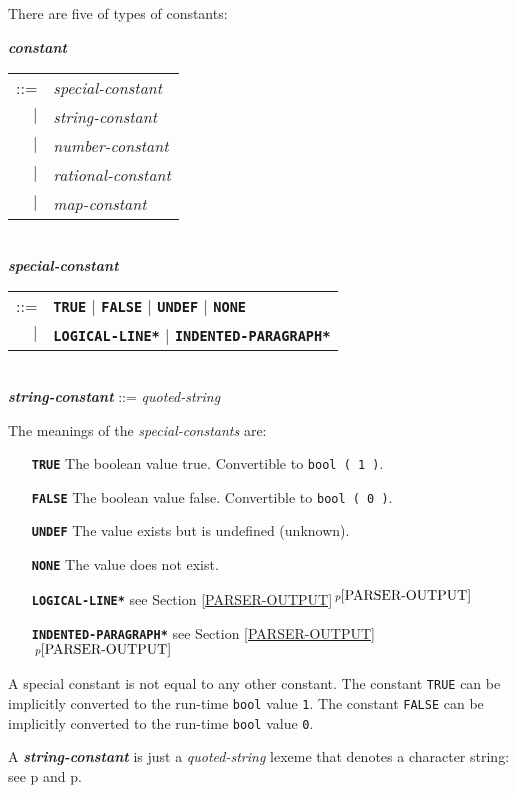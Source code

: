 \documentclass[12pt]{article}
\newcommand{\TT}[1]{{\tt \bfseries #1}}
\newcommand{\ttkey}[1]{{\tt \bfseries #1}}
\newcommand{\emkey}[1]{{\em \bfseries #1}}
\newcommand{\itemref}[1]{\ref{#1}$\,^{p\pageref{#1}}$}
\newcommand{\pagref}[1]{p\pageref{#1}}
\newenvironment{indpar}[1][0.3in]%
	{\begin{list}{}%
		     {\setlength{\itemsep}{0in}%
		      \setlength{\topsep}{0in}%
		      \setlength{\parsep}{1ex}%
		      \setlength{\labelwidth}{#1}%
		      \setlength{\leftmargin}{#1}%
		      \addtolength{\leftmargin}{\labelsep}}%
	 \item}%
	{\end{list}}
\begin{document}
There are five of types of constants:

\begin{indpar}
\emkey{constant}\label{CONSTANT}
    \begin{tabular}[t]{rl}
    ::= & {\em special-constant} \\
    $|$ & {\em string-constant} \\
    $|$ & {\em number-constant} \\
    $|$ & {\em rational-constant} \\
    $|$ & {\em map-constant} \\
    \end{tabular} \\
\emkey{special-constant}
    \begin{tabular}[t]{@{}rl}
    ::= & \ttkey{TRUE} $|$ \ttkey{FALSE}
                       $|$ \ttkey{UNDEF} $|$ \ttkey{NONE} \\
    $|$ & \ttkey{*LOGICAL-LINE*} $|$ \ttkey{*INDENTED-PARAGRAPH*} \\
    \end{tabular} \\
\emkey{string-constant}\label{STRING-CONSTANT} ::= {\em quoted-string}
\end{indpar}

The meanings of the {\em special-constants} are:
\begin{indpar}[1.6in]
\begin{itemize}
\item[\TT{TRUE}] The boolean value true.  Convertible to {\tt bool ( 1 )}.
\item[\TT{FALSE}] The boolean value false.  Convertible to {\tt bool ( 0 )}.
\item[\TT{UNDEF}] The value exists but is undefined (unknown).
\item[\TT{NONE}] The value does not exist.
\item[\TT{*LOGICAL-LINE*}] see Section \itemref{PARSER-OUTPUT}
\item[\TT{*INDENTED-PARAGRAPH*}] see Section \itemref{PARSER-OUTPUT}
\end{itemize}
\end{indpar}
A special constant is not equal to any other constant.
The constant {\tt TRUE} can be implicitly converted to the
run-time {\tt bool} value {\tt 1}.
The constant {\tt FALSE} can be implicitly converted to the
run-time {\tt bool} value {\tt 0}.

A \emkey{string-constant} is just a {\em quoted-string} lexeme
that denotes a character string: see
\pagref{QUOTED-STRING} and \pagref{QUOTED-STRING-CONCATENATION}.
\end{document}
